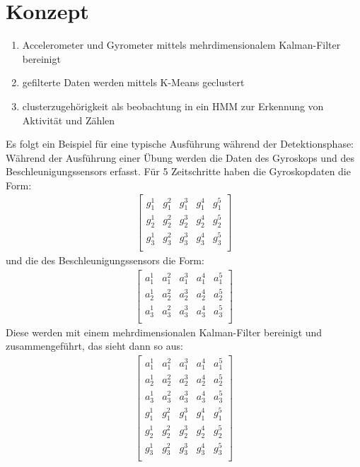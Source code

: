 \documentclass{article}
\begin{document}
\section{Konzept}
\begin{enumerate}
\item Accelerometer und Gyrometer mittels mehrdimensionalem Kalman-Filter bereinigt
\item gefilterte Daten werden mittels K-Means geclustert
\item clusterzugehörigkeit als beobachtung in ein HMM zur Erkennung von Aktivität und Zählen
\end{enumerate}
Es folgt ein Beispiel für eine typische Ausführung während der Detektionsphase:\\
Während der Ausführung einer Übung werden die Daten des Gyroskops und des Beschleunigungssensors erfasst.
Für 5 Zeitschritte haben die Gyroskopdaten die Form:
\begin{align*}
\left[\begin{array}{rrrrr}
g_{1}^1 & g_{1}^2 & g_{1}^3 & g_{1}^4 & g_{1}^5 \\
g_{2}^1 & g_{2}^2 & g_{2}^3 & g_{2}^4 & g_{2}^5 \\
g_{3}^1 & g_{3}^2 & g_{3}^3 & g_{3}^4 & g_{3}^5 \\
\end{array}\right]
\end{align*}
und die des Beschleunigungssensors die Form:
\begin{align*}
\left[\begin{array}{rrrrr}
a_{1}^1 & a_{1}^2 & a_{1}^3 & a_{1}^4 & a_{1}^5 \\
a_{2}^1 & a_{2}^2 & a_{2}^3 & a_{2}^4 & a_{2}^5 \\
a_{3}^1 & a_{3}^2 & a_{3}^3 & a_{3}^4 & a_{3}^5 \\
\end{array}\right]
\end{align*}
Diese werden mit einem mehrdimensionalen Kalman-Filter bereinigt und zusammengeführt, das sieht dann so aus:
\begin{align*}
\left[\begin{array}{rrrrr}
a_{1}^1 & a_{1}^2 & a_{1}^3 & a_{1}^4 & a_{1}^5 \\
a_{2}^1 & a_{2}^2 & a_{2}^3 & a_{2}^4 & a_{2}^5 \\
a_{3}^1 & a_{3}^2 & a_{3}^3 & a_{3}^4 & a_{3}^5 \\
g_{1}^1 & g_{1}^2 & g_{1}^3 & g_{1}^4 & g_{1}^5 \\
g_{2}^1 & g_{2}^2 & g_{2}^3 & g_{2}^4 & g_{2}^5 \\
g_{3}^1 & g_{3}^2 & g_{3}^3 & g_{3}^4 & g_{3}^5 \\
\end{array}\right]
\end{align*}
\end{document}
